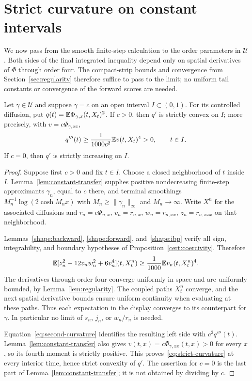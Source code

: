 \section{Strict curvature on constant intervals}\label{sec:curvature}
We now pass from the smooth finite-step calculation to the order parameters
in $\mathcal U$. Both sides of the final integrated inequality depend only on spatial
derivatives of $\Phi$ through order four.  The compact-strip bounds and
convergence from Section~\ref{sec:regularity} therefore suffice to pass to
the limit; no uniform tail constants or convergence of the forward scores
are needed.

\begin{proposition}\label{prop:gap-curvature}
Let $\gamma\in\mathcal U$ and suppose $\gamma=c$ on an open interval
$I\subset(0,1)$. For its controlled diffusion, put
$q(t)=\mathbb E\Phi_{\gamma,x}(t,X_t)^2$.
If $c>0$, then $q'$ is strictly convex on $I$; more precisely, with
$v=c\Phi_{\gamma,xx}$,
\begin{equation}\label{eq:strict-curvature}
 q'''(t)\geq\frac{1}{1000c^2}\mathbb E v(t,X_t)^4>0,
 \qquad t\in I.
\end{equation}
If $c=0$, then $q'$ is strictly increasing on $I$.
\end{proposition}

\begin{proof}
Suppose first $c>0$ and fix $t\in I$. Choose a closed neighborhood of
$t$ inside $I$. Lemma~\ref{lem:constant-transfer} supplies positive
nondecreasing finite-step approximants $\gamma_n$, equal to $c$ there,
and terminal smoothings $M_n^{-1}\log(2\cosh M_nx)$ with
$M_n\geq\|\gamma_n\|_\infty$ and $M_n\to\infty$.
Write $X^n$ for the associated diffusions and
$r_n=c\Phi_{n,x}$, $v_n=r_{n,x}$, $w_n=r_{n,xx}$, $z_n=r_{n,xxx}$
on that neighborhood.

Lemmas~\ref{shape:backward}, \ref{shape:forward}, and~\ref{shape:ibp}
verify all sign, integrability, and boundary hypotheses of
Proposition~\ref{cert:coercivity}. Therefore
\[
 \mathbb E[z_n^2-12v_nw_n^2+6v_n^4](t,X_t^n)
       \geq\frac1{1000}\mathbb E v_n(t,X_t^n)^4.
\]
The derivatives through order four converge uniformly in space and are
uniformly bounded, by Lemma~\ref{lem:regularity}. The coupled paths
$X_t^n$ converge, and the next spatial derivative bounds ensure uniform
continuity when evaluating at these paths. Thus each expectation in the
display converges to its counterpart for $\gamma$. In particular no
limit of $s_n$, $j_n$, or $w_n/r_n$ is needed.

Equation~\eqref{eq:second-curvature} identifies the resulting left side
with $c^2q'''(t)$. Lemma~\ref{lem:constant-transfer} also gives
$v(t,x)=c\Phi_{\gamma,xx}(t,x)>0$ for every $x$, so its fourth moment
is strictly positive. This proves~\eqref{eq:strict-curvature} at every
interior time, hence strict convexity of $q'$.
The assertion for $c=0$ is the last part of
Lemma~\ref{lem:constant-transfer}; it is not obtained by dividing by $c$.
\end{proof}
